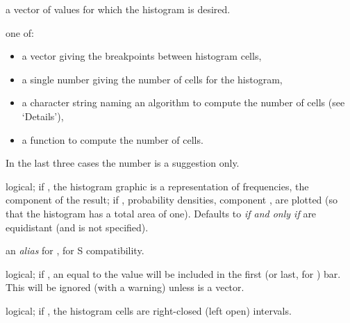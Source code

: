 \begin{Arguments}
\begin{ldescription}
\item[\code{x}] a vector of values for which the histogram is desired.
\item[\code{breaks}] one of:
\begin{itemize}

\item a vector giving the breakpoints between histogram cells,
\item a single number giving the number of cells for the histogram,
\item a character string naming an algorithm to compute the
number of cells (see `Details'),
\item a function to compute the number of cells.

\end{itemize}

In the last three cases the number is a suggestion only.

\item[\code{freq}] logical; if , the histogram graphic is a
representation of frequencies, the  component of
the result; if , probability densities, component
, are plotted (so that the histogram has a total area
of one).  Defaults to  \emph{if and only if}  are
equidistant (and  is not specified).
\item[\code{probability}] an \emph{alias} for , for S compatibility.
\item[\code{include.lowest}] logical; if , an  equal to
the  value will be included in the first (or last, for
) bar.  This will be ignored (with a warning)
unless  is a vector.
\item[\code{right}] logical; if , the histogram cells are
right-closed (left open) intervals.


\end{ldescription}
\end{Arguments}
